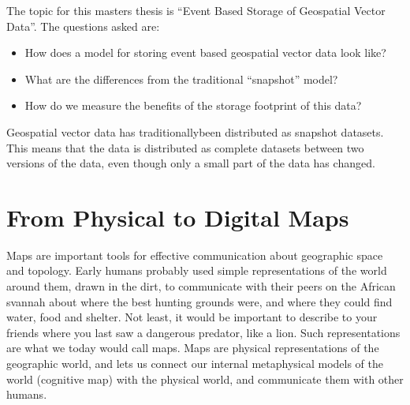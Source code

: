 The topic for this masters thesis is \enquote{Event Based Storage of Geospatial
Vector Data}. The questions asked are:

\begin{itemize}
\item How does a model for storing event based geospatial vector data look
  like?
\item What are the differences from the traditional \enquote{snapshot} model?
\item How do we measure the benefits of the storage footprint of this data?  
\end{itemize}
Geospatial vector data  has traditionallybeen distributed as snapshot datasets. This means
that the data is distributed as complete datasets between two versions of the
data, even though only a small part of the data has changed.



\section{From Physical to Digital Maps}
Maps are important tools for effective communication about geographic space and
topology. Early humans probably used simple representations of the world around
them, drawn in the dirt, to communicate with their peers on the African svannah
about where the best hunting grounds were, and where they could find water, food
and shelter. Not least, it would be important to describe to your friends where
you last saw a dangerous predator, like a lion. Such representations are what we
today would call maps. Maps are physical representations of the
geographic world, and lets us connect our internal metaphysical
models of the world (cognitive map) with the physical world, and communicate
them with other humans.

